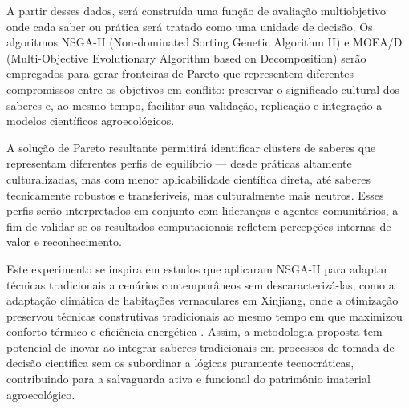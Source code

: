 A partir desses dados, será construída uma função de avaliação multiobjetivo onde cada saber ou prática será tratado como uma unidade de decisão. Os algoritmos NSGA-II (Non-dominated Sorting Genetic Algorithm II) e MOEA/D (Multi-Objective Evolutionary Algorithm based on Decomposition) serão empregados para gerar fronteiras de Pareto que representem diferentes compromissos entre os objetivos em conflito: preservar o significado cultural dos saberes e, ao mesmo tempo, facilitar sua validação, replicação e integração a modelos científicos agroecológicos.

A solução de Pareto resultante permitirá identificar clusters de saberes que representam diferentes perfis de equilíbrio — desde práticas altamente culturalizadas, mas com menor aplicabilidade científica direta, até saberes tecnicamente robustos e transferíveis, mas culturalmente mais neutros. Esses perfis serão interpretados em conjunto com lideranças e agentes comunitários, a fim de validar se os resultados computacionais refletem percepções internas de valor e reconhecimento.

Este experimento se inspira em estudos que aplicaram NSGA-II para adaptar técnicas tradicionais a cenários contemporâneos sem descaracterizá-las, como a adaptação climática de habitações vernaculares em Xinjiang, onde a otimização preservou técnicas construtivas tradicionais ao mesmo tempo em que maximizou conforto térmico e eficiência energética \cite{Tuluxun2025} \cite{Tuluxun2025}
. Assim, a metodologia proposta tem potencial de inovar ao integrar saberes tradicionais em processos de tomada de decisão científica sem os subordinar a lógicas puramente tecnocráticas, contribuindo para a salvaguarda ativa e funcional do patrimônio imaterial agroecológico.

\newpage